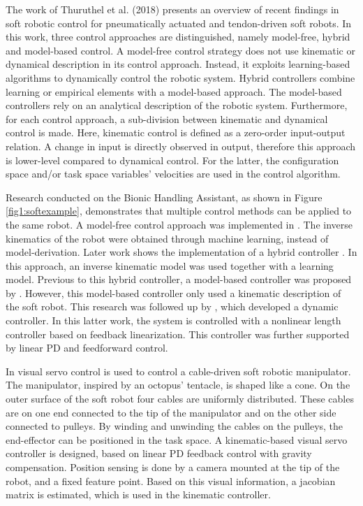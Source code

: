 The work of Thuruthel et al. (2018) \cite{george2018control} presents an overview of recent findings in soft robotic control for pneumatically actuated and tendon-driven soft robots. In this work, three control approaches are distinguished, namely model-free, hybrid and model-based control. A model-free control strategy does not use kinematic or dynamical description in its control approach. Instead, it exploits learning-based algorithms to dynamically control the robotic system. Hybrid controllers combine learning or empirical elements with a model-based approach. The model-based controllers rely on an analytical description of the robotic system. Furthermore, for each control approach, a sub-division between kinematic and dynamical control is made. Here, kinematic control is defined as a zero-order input-output relation. A change in input is directly observed in output, therefore this approach is lower-level compared to dynamical control. For the latter, the configuration space and/or task space variables' velocities are used in the control algorithm. 


Research conducted on the Bionic Handling Assistant, as shown in Figure \ref{fig1:softexample}, demonstrates that multiple control methods can be applied to the same robot. A model-free control approach was implemented in \cite{rolf2013efficient}. The inverse kinematics of the robot were obtained through machine learning, instead of model-derivation. Later work shows the implementation of a hybrid controller \cite{reinhart2017hybrid}. In this approach, an inverse kinematic model was used together with a learning model. Previous to this hybrid controller, a model-based controller was proposed by \cite{mahl2014bhakin}. However, this model-based controller only used a kinematic description of the soft robot. This research was followed up by \cite{falkenhahn2016dynamic}, which developed a dynamic controller. In this latter work, the system is controlled with a nonlinear length controller based on feedback linearization. This controller was further supported by linear PD and feedforward control. 

In \cite{wang2013visual} visual servo control is used to control a cable-driven soft robotic manipulator. The manipulator, inspired by an octopus' tentacle, is shaped like a cone. On the outer surface of the soft robot four cables are uniformly distributed. These cables are on one end connected to the tip of the manipulator and on the other side connected to pulleys. By winding and unwinding the cables on the pulleys, the end-effector can be positioned in the task space. A kinematic-based visual servo controller is designed, based on linear PD feedback control with gravity compensation. Position sensing is done by a camera mounted at the tip of the robot, and a fixed feature point. Based on this visual information, a jacobian matrix is estimated, which is used in the kinematic controller.

